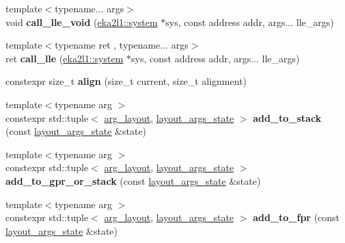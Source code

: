 \begin{DoxyCompactItemize}
\mbox{\label{namespaceeka2l1_1_1hle_a9ffefa7d4e790908867f1b4d348bfcc3}} 
{\footnotesize template$<$typename... args$>$ }\\void {\bfseries call\+\_\+lle\+\_\+void} (\mbox{\hyperlink{classeka2l1_1_1system}{eka2l1\+::system}} $\ast$sys, const address addr, args... lle\+\_\+args)
\item 
\mbox{\label{namespaceeka2l1_1_1hle_a8f8474e8d36469f1222cbe821dd2ac93}} 
{\footnotesize template$<$typename ret , typename... args$>$ }\\ret {\bfseries call\+\_\+lle} (\mbox{\hyperlink{classeka2l1_1_1system}{eka2l1\+::system}} $\ast$sys, const address addr, args... lle\+\_\+args)
\item 
\mbox{\label{namespaceeka2l1_1_1hle_a2017fb111614f3ddf19b2eb4d0e18507}} 
constexpr size\+\_\+t {\bfseries align} (size\+\_\+t current, size\+\_\+t alignment)
\item 
\mbox{\label{namespaceeka2l1_1_1hle_aac341a24269a4c195bba639f4d2d57d2}} 
{\footnotesize template$<$typename arg $>$ }\\constexpr std\+::tuple$<$ \mbox{\hyperlink{structeka2l1_1_1hle_1_1arg__layout}{arg\+\_\+layout}}, \mbox{\hyperlink{structeka2l1_1_1hle_1_1layout__args__state}{layout\+\_\+args\+\_\+state}} $>$ {\bfseries add\+\_\+to\+\_\+stack} (const \mbox{\hyperlink{structeka2l1_1_1hle_1_1layout__args__state}{layout\+\_\+args\+\_\+state}} \&state)
\item 
\mbox{\label{namespaceeka2l1_1_1hle_a7bd99b11b409b54a6a877ad5c7dcced9}} 
{\footnotesize template$<$typename arg $>$ }\\constexpr std\+::tuple$<$ \mbox{\hyperlink{structeka2l1_1_1hle_1_1arg__layout}{arg\+\_\+layout}}, \mbox{\hyperlink{structeka2l1_1_1hle_1_1layout__args__state}{layout\+\_\+args\+\_\+state}} $>$ {\bfseries add\+\_\+to\+\_\+gpr\+\_\+or\+\_\+stack} (const \mbox{\hyperlink{structeka2l1_1_1hle_1_1layout__args__state}{layout\+\_\+args\+\_\+state}} \&state)
\item 
\mbox{\label{namespaceeka2l1_1_1hle_a6528b86ec78e945ea6e0ea4f5f7ea62e}} 
{\footnotesize template$<$typename arg $>$ }\\constexpr std\+::tuple$<$ \mbox{\hyperlink{structeka2l1_1_1hle_1_1arg__layout}{arg\+\_\+layout}}, \mbox{\hyperlink{structeka2l1_1_1hle_1_1layout__args__state}{layout\+\_\+args\+\_\+state}} $>$ {\bfseries add\+\_\+to\+\_\+fpr} (const \mbox{\hyperlink{structeka2l1_1_1hle_1_1layout__args__state}{layout\+\_\+args\+\_\+state}} \&state)

\end{DoxyCompactItemize}
